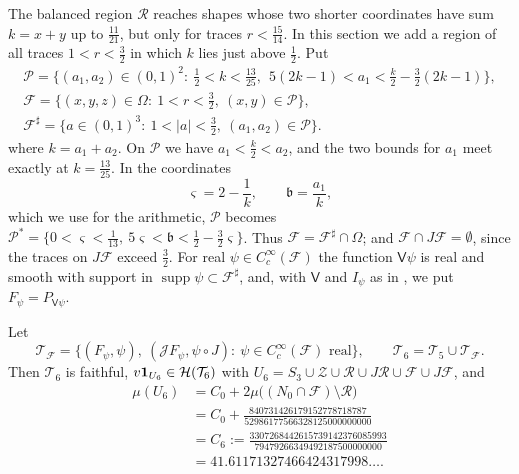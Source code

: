 \documentclass[11pt,colorlinks]{charlie}
\newcommand{\Om}{\Omega}
\begin{document}
The balanced region $\mathcal R$ reaches shapes whose two shorter coordinates have sum $k=x+y$ up to $\frac{11}{21}$, but only for traces $r<\frac{15}{14}$. In this section we add a region of all traces $1<r<\frac32$ in which $k$ lies just above $\frac12$. Put
\begin{gather*}
 \mathcal P=\Big\{(a_1,a_2)\in(0,1)^2:\ \tfrac12<k<\tfrac{13}{25},\ \ 5(2k-1)<a_1<\tfrac k2-\tfrac32(2k-1)\Big\},\\
 \mathcal F=\{(x,y,z)\in\Om:\ 1<r<\tfrac32,\ (x,y)\in\mathcal P\},\\
 \mathcal F^\sharp=\{a\in(0,1)^3:\ 1<|a|<\tfrac32,\ (a_1,a_2)\in\mathcal P\}.
\end{gather*}
where $k=a_1+a_2$. On $\mathcal P$ we have $a_1<\frac k2<a_2$, and the two bounds for $a_1$ meet exactly at $k=\frac{13}{25}$. In the coordinates
\[
 \varsigma=2-\frac1k,\qquad\mathfrak b=\frac{a_1}k ,
\]
which we use for the arithmetic, $\mathcal P$ becomes $\mathcal P^*=\{0<\varsigma<\frac1{13},\ 5\varsigma<\mathfrak b<\frac12-\frac32\varsigma\}$. Thus $\mathcal F=\mathcal F^\sharp\cap\Om$; and $\mathcal F\cap J\mathcal F=\emptyset$, since the traces on $J\mathcal F$ exceed $\frac32$. For real $\psi\in C_c^\infty(\mathcal F)$ the function $\mathsf V\psi$ is real and smooth with support in $\operatorname{supp}\psi\subset\mathcal F^\sharp$, and, with $\mathsf V$ and $I_\psi$ as in , we put $F_\psi=P_{\mathsf V\psi}$.

\begin{theorem}\label{thm:factorable}
Let
\[
 \mathcal T_{\mathcal F}=\big\{(F_\psi,\psi),\ (\mathcal JF_\psi,\psi\circ J):\ \psi\in C_c^\infty(\mathcal F)\text{ real}\big\},\qquad\mathcal T_6=\mathcal T_5\cup\mathcal T_{\mathcal F}.
\]
Then $\mathcal T_6$ is faithful, $v\mathbf{1}_{U_6}\in\mathcal H(\mathcal T_6)$ with $U_6=S_3\cup\mathcal Z\cup\mathcal R\cup J\mathcal R\cup\mathcal F\cup J\mathcal F$, and
\begin{align*}
 \mu(U_6)&=C_0+2\mu\big((N_0\cap\mathcal F)\setminus\mathcal R\big)\\
 &=C_0+\frac{840731426179152778718787}{52986177566328125000000000}\\
 &=C_6:=\frac{3307268442615739142376085993}{79479266349492187500000000}\\
 &=41.61171327466424317998\ldots .
\end{align*}
\end{theorem}
\end{document}
